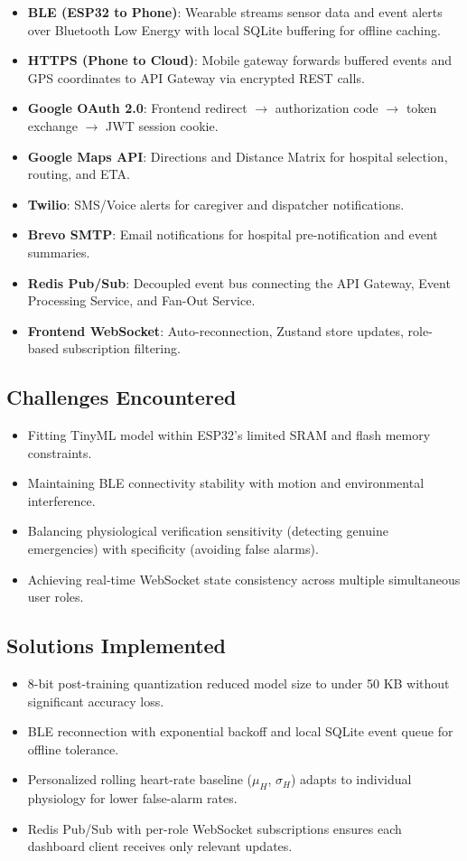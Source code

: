 \begin{itemize}
\item \textbf{BLE (ESP32 to Phone)}: Wearable streams sensor data and event alerts over Bluetooth Low Energy with local SQLite buffering for offline caching.
\item \textbf{HTTPS (Phone to Cloud)}: Mobile gateway forwards buffered events and GPS coordinates to API Gateway via encrypted REST calls.
\item \textbf{Google OAuth 2.0}: Frontend redirect $\rightarrow$ authorization code $\rightarrow$ token exchange $\rightarrow$ JWT session cookie.
\item \textbf{Google Maps API}: Directions and Distance Matrix for hospital selection, routing, and ETA.
\item \textbf{Twilio}: SMS/Voice alerts for caregiver and dispatcher notifications.
\item \textbf{Brevo SMTP}: Email notifications for hospital pre-notification and event summaries.
\item \textbf{Redis Pub/Sub}: Decoupled event bus connecting the API Gateway, Event Processing Service, and Fan-Out Service.
\item \textbf{Frontend WebSocket}: Auto-reconnection, Zustand store updates, role-based subscription filtering.
\end{itemize}

\subsection{Challenges Encountered}

\begin{itemize}
\item Fitting TinyML model within ESP32's limited SRAM and flash memory constraints.
\item Maintaining BLE connectivity stability with motion and environmental interference.
\item Balancing physiological verification sensitivity (detecting genuine emergencies) with specificity (avoiding false alarms).
\item Achieving real-time WebSocket state consistency across multiple simultaneous user roles.
\end{itemize}

\subsection{Solutions Implemented}

\begin{itemize}
\item 8-bit post-training quantization reduced model size to under 50 KB without significant accuracy loss.
\item BLE reconnection with exponential backoff and local SQLite event queue for offline tolerance.
\item Personalized rolling heart-rate baseline ($\mu_H$, $\sigma_H$) adapts to individual physiology for lower false-alarm rates.
\item Redis Pub/Sub with per-role WebSocket subscriptions ensures each dashboard client receives only relevant updates.
\end{itemize}

